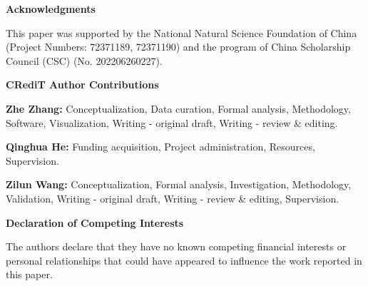 \documentclass[12pt]{article}
\begin{document}
\vspace{2em}

\noindent\textbf{Acknowledgments}

\vspace{1em}

\noindent
This paper was supported by the National Natural Science Foundation of China (Project Numbers: 72371189, 72371190) and the program of China Scholarship Council (CSC) (No. 202206260227).

\vspace{2em}

\noindent\textbf{CRediT Author Contributions}

\vspace{1em}

\noindent
\textbf{Zhe Zhang:} Conceptualization, Data curation, Formal analysis, Methodology, Software, Visualization, Writing - original draft, Writing - review \& editing.

\vspace{0.5em}

\noindent
\textbf{Qinghua He:} Funding acquisition, Project administration, Resources, Supervision.

\vspace{0.5em}

\noindent
\textbf{Zilun Wang:} Conceptualization, Formal analysis, Investigation, Methodology, Validation, Writing - original draft, Writing - review \& editing, Supervision.

\vspace{2em}

\noindent\textbf{Declaration of Competing Interests}

\vspace{1em}

\noindent
The authors declare that they have no known competing financial interests or personal relationships that could have appeared to influence the work reported in this paper.
\end{document}
